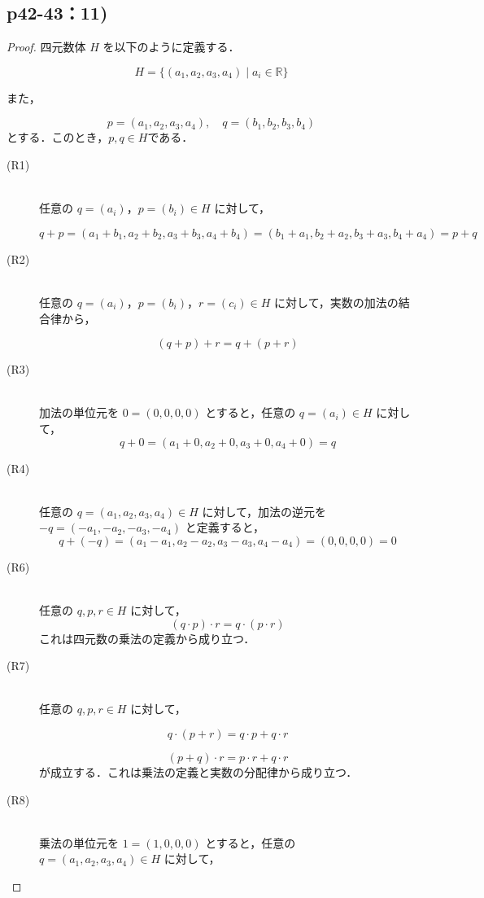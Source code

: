 \documentclass[a4paper,10pt,fleqn]{ltjsarticle}
\begin{document}
\newpage 

\subsection*{p42-43：11)}

\begin{leftbar}
\begin{proof}
四元数体 $H$ を以下のように定義する．

\[
H = \{ (a_1, a_2, a_3, a_4) \mid a_i \in \mathbb{R}\}
\]

また，

\[
p=(a_1, a_2, a_3, a_4),\quad q=(b_1, b_2, b_3, b_4)
\]
とする．このとき，$ p ,q \in H$である．
\begin{description}
\item [(R1)] \mbox{} \\
    任意の $q = (a_i)$，$p = (b_i) \in H$ に対して，
    
    \[
    q + p = (a_1 + b_1, a_2 + b_2, a_3 + b_3, a_4 + b_4) = (b_1 + a_1, b_2 + a_2, b_3 + a_3, b_4 + a_4) = p + q
    \]
\item [(R2)] \mbox{} \\
任意の $q = (a_i)$，$p = (b_i)$，$r = (c_i) \in H$ に対して，実数の加法の結合律から，

\[
(q + p) + r = q + (p + r)
\]
\item [(R3)] \mbox{} \\
加法の単位元を $0 = (0, 0, 0, 0)$ とすると，任意の $q = (a_i) \in H$ に対して，
\[
q + 0 = (a_1 + 0, a_2 + 0, a_3 + 0, a_4 + 0) = q
\]

\item [(R4)] \mbox{} \\
任意の $q = (a_1, a_2, a_3, a_4) \in H$ に対して，加法の逆元を $-q = (-a_1, -a_2, -a_3, -a_4)$ と定義すると，
\[
q + (-q) = (a_1 - a_1, a_2 - a_2, a_3 - a_3, a_4 - a_4) = (0, 0, 0, 0) = 0
\]
\item [(R6)] \mbox{} \\
任意の $q, p, r \in H$ に対して，
\[
(q \cdot p) \cdot r = q \cdot (p \cdot r)
\]
これは四元数の乗法の定義から成り立つ．
\item[(R7)] \mbox{} \\
任意の $q, p, r \in H$ に対して，

\[
q \cdot (p + r) = q \cdot p + q \cdot r
\]

\[
(p + q) \cdot r = p \cdot r + q \cdot r
\]
が成立する．これは乗法の定義と実数の分配律から成り立つ．
\item [(R8)] \mbox{} \\
乗法の単位元を $1 = (1, 0, 0, 0)$ とすると，任意の $q = (a_1, a_2, a_3, a_4) \in H$ に対して，


\end{description}
\end{proof}
\end{leftbar}
\end{document}
